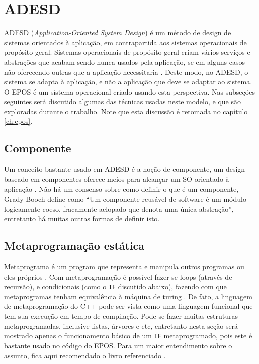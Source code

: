 \section{ADESD}

ADESD (\emph{Application-Oriented System Design}) é um método de design de sistemas orientados à aplicação, em contrapartida aos sistemas operacionais de propósito geral.
Sistemas operacionais de propósito geral criam vários serviços e abstrações que acabam sendo nunca usados pela aplicação, se em alguns casos não oferecendo outras que a aplicação necessitaria \cite{guto_thesis}. Deste modo, no ADESD, o sistema se adapta à aplicação, e não a aplicação que deve se adaptar ao sistema. O EPOS é um sistema operacional criado usando esta perspectiva. Nas subseções seguintes será discutido algumas das técnicas usadas neste modelo, e que são exploradas durante o trabalho. Note que esta discussão é retomada no capítulo \ref{ch:epos}.

\subsection{Componente}
Um conceito bastante usado em ADESD é a noção de componente, um design baseado em componentes oferece meios para alcançar um SO orientado à aplicação \cite[p.~4]{guto_thesis}. Não há um consenso sobre como definir o que é um componente, Grady Booch define como ``Um componente reusável de software é um módulo logicamente coeso, fracamente aclopado que denota uma única abstração'', entretanto há muitas outras formas de definir isto.


\subsection{Metaprogramação estática}
Metaprograma é um program que representa e manipula outros programas ou eles próprios \cite{generative}.
Com metaprogramação é possível fazer-se loops (através de recursão), e condicionais (como o \verb+IF+ discutido abaixo), fazendo com que metaprogramas tenham equivalência à máquina de turing \cite{generative}. De fato, a linguagem de metaprogramação do C++ pode ser vista como uma linguagem funcional que tem sua execução em tempo de compilação. Pode-se fazer muitas estruturas metaprogramadas, inclusive listas, árvores e etc, entretanto nesta seção será mostrado apenas o funcionamento básico de um \verb+IF+ metaprogramado, pois este é bastante usado no código do EPOS. Para um maior entendimento sobre o assunto, fica aqui recomendado o livro referenciado \cite{generative}.


